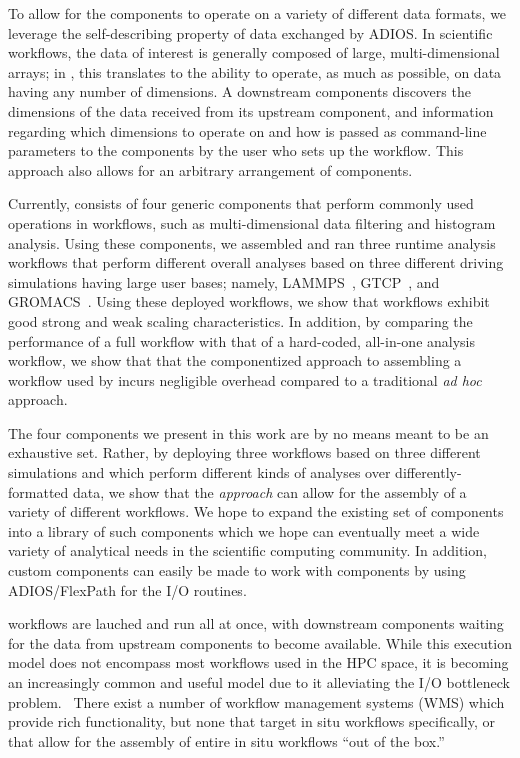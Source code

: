 To allow for the \sys components to operate
on a variety of different data formats, we
leverage the self-describing property
of data exchanged by ADIOS.
In scientific workflows, the data of interest
is generally composed of large, multi-dimensional
arrays; in \sys, this translates to
the ability to operate, as much as possible,
on data having any number of dimensions.
A downstream components discovers the dimensions
of the data received from its upstream component,
and information regarding which dimensions to operate
on and how is passed as command-line parameters
to the \sys components by the user who sets up
the workflow. This approach also allows for an
arbitrary arrangement of components.

Currently, \sys consists of four generic components that
perform commonly used operations in workflows, such
as multi-dimensional data filtering and histogram
analysis. Using these components, we assembled
and ran three runtime analysis workflows that perform
different overall analyses
based on three different driving simulations
having large user bases; namely,
LAMMPS~\cite{plimpton:1997:lammps},
GTCP~\cite{lin:gtc},
and GROMACS~\cite{hess2008gromacs}.
Using these deployed workflows,
we show that \sys workflows exhibit
good strong and weak scaling characteristics.
In addition, by comparing the performance
of a full \sys workflow with that of a
hard-coded, all-in-one analysis workflow,
we show that that the componentized approach to
assembling a workflow used by \sys
incurs negligible overhead compared
to a traditional \textit{ad hoc} approach.

The four components we present in this work
are by no means meant to be an exhaustive set.
Rather, by deploying three workflows
based on three different simulations
and which perform different kinds of
analyses over differently-formatted data,
we show that the \sys \textit{approach}
can allow for the assembly
of a variety of different workflows.
We hope to expand the existing set of
components into a library of such components
which we hope can eventually meet
a wide variety of analytical needs in the
scientific computing community.
In addition, custom components
can easily be made to work with
\sys components by using ADIOS/FlexPath
for the I/O routines.

\sys workflows are lauched and run all at once,
with downstream components waiting for
the data from upstream components to become
available.
While this execution model does not encompass
most workflows used in the HPC space, it
is becoming an increasingly common and useful model
due to it alleviating the I/O bottleneck problem.~\cite{ayachit2016performance}
There exist a number of workflow management systems (WMS)
which provide rich functionality, but none
that target in situ workflows specifically,
or that allow for the assembly of entire
in situ workflows ``out of the box.''

